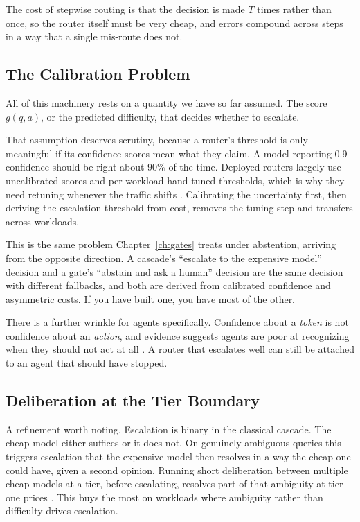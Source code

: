 The cost of stepwise routing is that the decision is made $T$ times rather than
once, so the router itself must be very cheap, and errors compound across steps
in a way that a single mis-route does not.

\subsection{The Calibration Problem}

All of this machinery rests on a quantity we have so far assumed. The score
$g(q,a)$, or the predicted difficulty, that decides whether to escalate.

That assumption deserves scrutiny, because a router's threshold is only
meaningful if its confidence scores mean what they claim. A model reporting 0.9
confidence should be right about 90\% of the time. Deployed routers largely use
uncalibrated scores and per-workload hand-tuned thresholds, which is why they
need retuning whenever the traffic shifts \cite{ucci2026}. Calibrating the
uncertainty first, then deriving the escalation threshold from cost, removes the
tuning step and transfers across workloads.

This is the same problem Chapter~\ref{ch:gates} treats under abstention, arriving
from the opposite direction. A cascade's ``escalate to the expensive model''
decision and a gate's ``abstain and ask a human'' decision are the same decision
with different fallbacks, and both are derived from calibrated confidence and
asymmetric costs. If you have built one, you have most of the other.

There is a further wrinkle for agents specifically. Confidence about a
\emph{token} is not confidence about an \emph{action}, and evidence suggests
agents are poor at recognizing when they should not act at all
\cite{agentabstain2026}. A router that escalates well can still be attached to an
agent that should have stopped.

\subsection{Deliberation at the Tier Boundary}

A refinement worth noting. Escalation is binary in the classical cascade. The
cheap model either suffices or it does not. On genuinely ambiguous queries this
triggers escalation that the expensive model then resolves in a way the cheap one
could have, given a second opinion. Running short deliberation between multiple
cheap models at a tier, before escalating, resolves part of that ambiguity at
tier-one prices \cite{cascadedebate2026}. This buys the most on workloads where
ambiguity rather than difficulty drives escalation.

